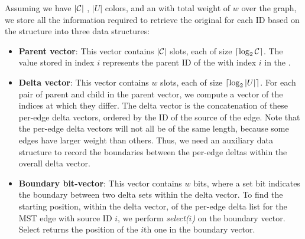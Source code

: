Assuming we have $|\mathcal{C}|$ \ccs,
$|U|$ colors, and an \mst with total weight of $w$ over the \cc graph,
we store all the information required to retrieve the original \cbv for each \cc ID
based on the \mst structure into three data structures:
\begin{itemize}
    \item \textbf{Parent vector}: This vector contains $|\mathcal{C}|$
    slots, each of size $\left\lceil \log_2 {\mathcal{C}} \right\rceil$.  The value stored
    in index $i$ represents the parent \cc ID of the \cc with index
    $i$ in the \mst.
    \item \textbf{Delta vector}: This vector contains $w$ slots, each
    of size $\left\lceil \log_2 {|U|} \right\rceil$.  For each pair of parent and
    child in the parent vector, we compute a vector of the indices
    at which they differ.  The delta vector is the concatenation of
    these per-edge delta vectors, ordered by the ID of the source of
    the edge.  Note that the per-edge delta vectors will not all be
    of the same length, because some edges have larger weight than
    others.  Thus, we need an auxiliary data structure to record the
    boundaries between the per-edge deltas within the overall delta
    vector.
    \item \textbf{Boundary bit-vector}: This vector contains $w$ bits,
    where a set bit indicates the boundary between two delta sets
    within the delta vector.  To find the starting position, within
    the delta vector, of the per-edge delta list for the MST edge
    with source ID $i$, we perform \textit{select($i$)} on
    the boundary vector.  Select returns the position of the $i$th
    one in the boundary vector.
\end{itemize}

